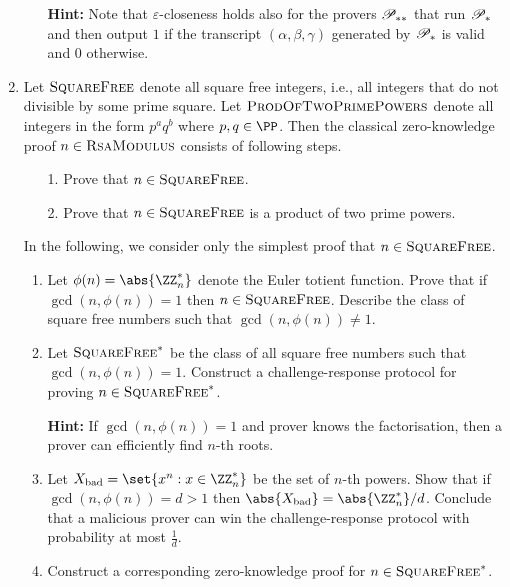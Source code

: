 \documentclass{article}
\begin{document}
\begin{enumerate}
\begin{enumerate}
      \textbf{Hint:} Note that $\varepsilon$-closeness holds also for
      the provers $\mathscr{P}_{**}$ that run $\mathscr{P}_*$ and then output
      $1$ if the transcript $(\alpha,\beta,\gamma)$ generated by
      $\mathscr{P}_*$ is valid and $0$ otherwise.
    \end{enumerate}



\item Let $\textsc{SquareFree}$ denote all square free integers, i.e.,
  all integers that do not divisible by some prime square. Let
  $\textsc{ProdOfTwoPrimePowers}$ denote all integers in the form
  $p^aq^b$ where $p,q\in\PP$. Then the classical zero-knowledge proof
  $n\in\textsc{RsaModulus}$ consists of following steps.
  \begin{enumerate}
  \item[1.] Prove that $n\in\textsc{SquareFree}$.
  \item[2.] Prove that $n\in\textsc{SquareFree}$ is a product of two prime powers.
  \end{enumerate}
  In the following, we consider only the simplest proof that
  $n\in\textsc{SquareFree}$.
  \begin{enumerate}
  \item Let $\phi(n)=\abs{\ZZ_n^*}$ denote the Euler totient function.
    Prove that if $\gcd(n,\phi(n))= 1$ then $n\in\textsc{SquareFree}$.
    Describe the class of square free numbers such that
    $\gcd(n,\phi(n))\neq 1$.
  \item Let $\textsc{SquareFree}^*$ be the class of all square free
    numbers such that $\gcd(n,\phi(n))= 1$. Construct a
    challenge-response protocol for proving  $n\in\textsc{SquareFree}^*$.
 
    \textbf{Hint:} If $\gcd(n,\phi(n))=1$ and prover knows the
    factorisation, then a prover can efficiently find $n$-th roots.
  \item Let $X_{\mathrm{bad}}=\set{x^n:x\in\ZZ_n^*}$ be the set of
    $n$-th powers. Show that if $\gcd(n,\phi(n))=d>1$ then
    $\abs{X_{\mathrm{bad}}}=\abs{\ZZ_n^*}/d$. Conclude that a
    malicious prover can win the challenge-response protocol with
    probability at most $\frac{1}{d}$.
  \item Construct a corresponding zero-knowledge proof for $n\in\textsc{SquareFree}^*$.
  \end{enumerate}

\end{enumerate}
\end{document}
